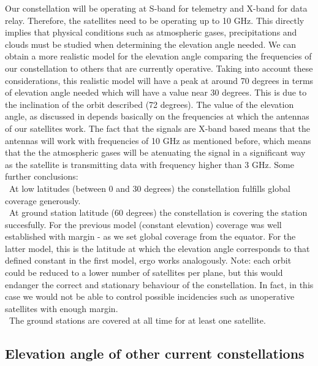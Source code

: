Our constellation will be operating at S-band for telemetry and X-band for data relay. Therefore, the satellites need to be operating up to 10 GHz. This directly implies that physical conditions such as atmospheric gases, precipitations and clouds must be studied when determining the elevation angle needed. We can obtain a more realistic model for the elevation angle comparing the frequencies of our constellation to others that are currently operative. Taking into account these considerations, this realistic model will have a peak at around 70 degrees in terms of elevation angle needed which will have a value near 30 degrees. This is due to the inclination of the orbit described (72 degrees). The value of the elevation angle, as discussed in \cite{Li2016} depends basically on the frequencies at which the antennas of our satellites work. The fact that the signals are X-band based means that the antennas will work with frequencies of 10 GHz as mentioned before, which means that the the atmospheric gases will be atenuating the signal in a significant way as the satellite is transmitting data with frequency higher than 3 GHz. Some further conclusions:\\

\textendash\  At low latitudes (between 0 and 30 degrees) the constellation fulfills global coverage generously. \\

\textendash\ At ground station latitude (60 degrees) the constellation is covering the station succesfully. For the previous model (constant elevation) coverage was well established with margin - as we set global coverage from the equator. For the latter model, this is the latitude at which the elevation angle corresponds to that defined constant in the first model, ergo works analogously. Note: each orbit could be reduced to a lower number of satellites per plane, but this would endanger the correct and stationary behaviour of the constellation. In fact, in this case we would not be able to control possible incidencies such as unoperative satellites with enough margin. \\

\textendash\ The ground stations are covered at all time for at least one satellite.\\

\subsection{Elevation angle of other current constellations}




